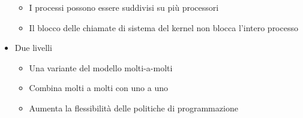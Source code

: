 \documentclass{article}
\begin{document}
\begin{itemize}
\begin{itemize}
            \item I processi possono essere suddivisi su più processori
            \item Il blocco delle chiamate di sistema del kernel non blocca l'intero processo
        \end{itemize}
    \item Due livelli
        \begin{itemize}
            \item Una variante del modello molti-a-molti
            \item Combina molti a molti con uno a uno
            \item Aumenta la flessibilità delle politiche di programmazione
        \end{itemize}
\end{itemize}

\pagebreak
\end{document}
